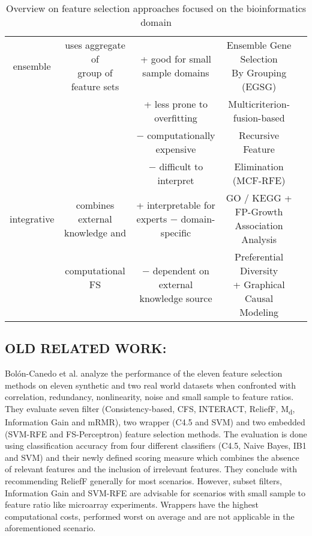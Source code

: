 \begin{table}[h!]
\begin{tabular}{ | c | c | c | c | c | }
  ensemble & \makecell{uses aggregate of \\ group of feature sets} & \makecell{+ good for small \\ sample domains} & \makecell{Ensemble Gene Selection \\ By Grouping (EGSG)\cite{liu2010ensemble}}\\
  & & + less prone to overfitting & Multicriterion-fusion-based\\ 
  & & $-$ computationally expensive & Recursive Feature\\
  & & $-$ difficult to interpret & Elimination (MCF-RFE)\cite{yang2011robust}\\ \hline
  
  integrative & \makecell{combines external \\ knowledge and} & \makecell{+ interpretable for experts \\ $-$ domain-specific} & \makecell{GO / KEGG + FP-Growth  \\ Association Analysis}\cite{fang2014integrative}\\
  & \makecell{computational FS \\ ~} & \makecell{$-$ dependent on external \\  knowledge source} & \makecell{Preferential Diversity \\ + Graphical Causal Modeling}\cite{raghu2017integrated}\\ \hline
  
\end{tabular}
\caption{Overview on feature selection approaches focused on the bioinformatics domain}
\label{tab:feature_selection}
\end{table}  

\subsection{OLD RELATED WORK:}

Bolón-Canedo et al. analyze the performance of the eleven feature selection methods on eleven synthetic and two real world datasets when confronted with correlation, redundancy, nonlinearity, noise and small sample to feature ratios. They evaluate seven filter (Consistency-based, CFS, INTERACT, ReliefF, M\textsubscript{d}, Information Gain and mRMR), two wrapper (C4.5 and SVM) and two embedded (SVM-RFE and FS-Perceptron) feature selection methods. The evaluation is done using classification accuracy from four different classifiers (C4.5, Naive Bayes, IB1 and SVM) and their newly defined scoring measure which combines the absence of relevant features and the inclusion of irrelevant features. They conclude with recommending ReliefF generally for most scenarios. However, subset filters, Information Gain and SVM-RFE are advisable for scenarios with small sample to feature ratio like microarray experiments. Wrappers have the highest computational costs, performed worst on average and are not applicable in the aforementioned scenario. \cite{bolon2013review}

